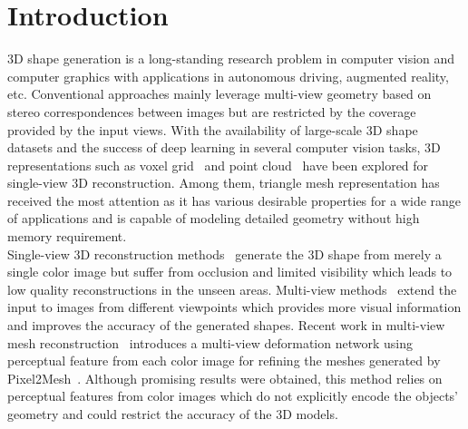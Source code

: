 \section{Introduction}

3D shape generation is a long-standing research problem in computer vision and computer graphics with applications in autonomous driving, augmented reality, etc. Conventional approaches mainly leverage multi-view geometry based on stereo correspondences between images but are restricted by the coverage provided by the input views. With the availability of large-scale 3D shape datasets and the success of deep learning in several computer vision tasks, 3D representations such as voxel grid~\cite{3dr2n2, tulsiani2017multi, yan2016perspective} and point cloud~\cite{yang2018foldingnet, fan2017point} have been explored for single-view 3D reconstruction.
Among them, triangle mesh representation has received the most attention as it has various desirable properties for a wide range of applications and is capable of modeling detailed geometry without high memory requirement.
\\
Single-view 3D reconstruction methods~\cite{wang2018pixel2mesh,huang2015single,kar2015category,su2014estimating} generate the 3D shape from merely a single color image but suffer from occlusion and limited visibility which leads to low quality reconstructions in the unseen areas.
Multi-view methods~\cite{wen2019pixel2mesh++,3dr2n2,kar2017lsm,mcrecon2017} extend the input to images from different viewpoints which provides more visual information and improves the accuracy of the generated shapes.
Recent work in multi-view mesh reconstruction~\cite{wen2019pixel2mesh++} introduces a multi-view deformation network using perceptual feature from each color image for refining the meshes generated by Pixel2Mesh~\cite{wang2018pixel2mesh}.
Although promising results were obtained, this method relies on perceptual features from color images which do not explicitly encode the objects' geometry and could restrict the accuracy of the 3D models.


